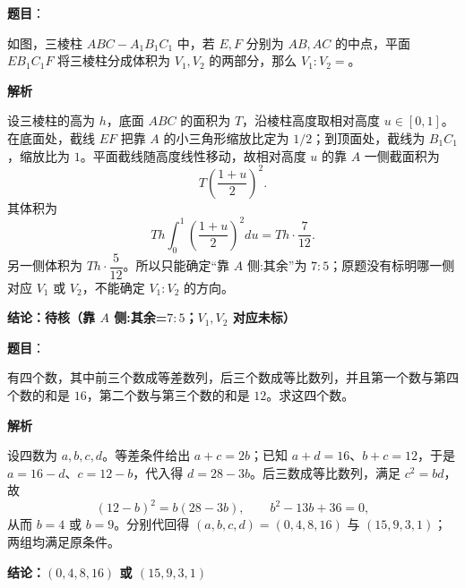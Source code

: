 \begin{answer}

\textbf{题目}：

如图，三棱柱 $ABC-A_1B_1C_1$ 中，若 $E,F$ 分别为 $AB,AC$ 的中点，平面 $EB_1C_1F$ 将三棱柱分成体积为 $V_1,V_2$ 的两部分，那么 $V_1:V_2=$\gkblank{}。
\nopagebreak[4]
\begin{center}\end{center}
\nopagebreak[4]
\textbf{解析}

设三棱柱的高为 $h$，底面 $ABC$ 的面积为 $T$，沿棱柱高度取相对高度 $u\in[0,1]$。在底面处，截线 $EF$ 把靠 $A$ 的小三角形缩放比定为 $1/2$；到顶面处，截线为 $B_1C_1$，缩放比为 $1$。平面截线随高度线性移动，故相对高度 $u$ 的靠 $A$ 一侧截面积为
\nopagebreak[4]
\[
T\left(\frac{1+u}{2}\right)^2.
\]
其体积为
\nopagebreak[4]
\[
Th\int_0^1\left(\frac{1+u}{2}\right)^2du
=Th\cdot\frac7{12}.
\]
另一侧体积为 $Th\cdot\dfrac5{12}$。所以只能确定“靠 $A$ 侧:其余”为 $7:5$；原题没有标明哪一侧对应 $V_1$ 或 $V_2$，不能确定 $V_1:V_2$ 的方向。

\textbf{结论：待核（靠 $A$ 侧:其余=$7:5$；$V_1,V_2$ 对应未标）}


\end{answer}
\begin{answer}

\textbf{题目}：

有四个数，其中前三个数成等差数列，后三个数成等比数列，并且第一个数与第四个数的和是 $16$，第二个数与第三个数的和是 $12$。求这四个数。

\textbf{解析}

设四数为 $a,b,c,d$。等差条件给出 $a+c=2b$；已知 $a+d=16$、$b+c=12$，于是 $a=16-d$、$c=12-b$，代入得 $d=28-3b$。后三数成等比数列，满足 $c^2=bd$，故
\nopagebreak[4]
\[
(12-b)^2=b(28-3b),
\qquad b^2-13b+36=0,
\]
从而 $b=4$ 或 $b=9$。分别代回得 $(a,b,c,d)=(0,4,8,16)$ 与 $(15,9,3,1)$；两组均满足原条件。

\textbf{结论：$(0,4,8,16)$ 或 $(15,9,3,1)$}


\end{answer}
